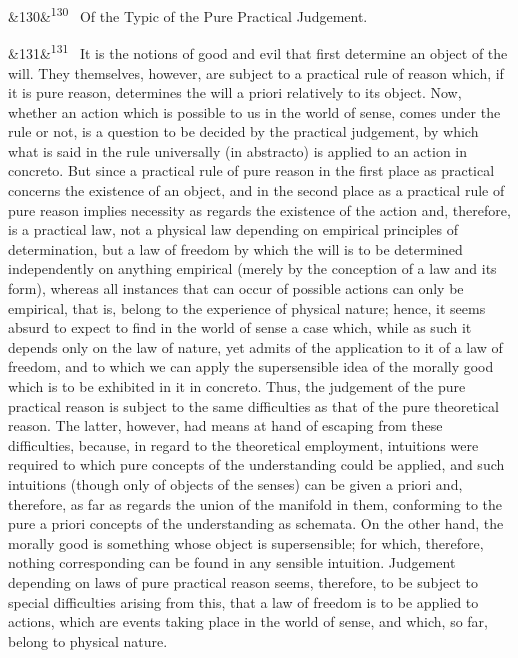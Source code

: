 \documentclass[12pt]{article}
\newcommand{\para}[1][]{\par\noindent\ifx&#1&\else\textsuperscript{\footnotesize #1}~\fi}
\begin{document}
\para[130] Of the Typic of the Pure Practical Judgement.

\para[131] It is the notions of good and evil that first determine an object of the will. They themselves, however, are subject to a practical rule of reason which, if it is pure reason, determines the will a priori relatively to its object. Now, whether an action which is possible to us in the world of sense, comes under the rule or not, is a question to be decided by the practical judgement, by which what is said in the rule universally (in abstracto) is applied to an action in concreto. But since a practical rule of pure reason in the first place as practical concerns the existence of an object, and in the second place as a practical rule of pure reason implies necessity as regards the existence of the action and, therefore, is a practical law, not a physical law depending on empirical principles of determination, but a law of freedom by which the will is to be determined independently on anything empirical (merely by the conception of a law and its form), whereas all instances that can occur of possible actions can only be empirical, that is, belong to the experience of physical nature; hence, it seems absurd to expect to find in the world of sense a case which, while as such it depends only on the law of nature, yet admits of the application to it of a law of freedom, and to which we can apply the supersensible idea of the morally good which is to be exhibited in it in concreto. Thus, the judgement of the pure practical reason is subject to the same difficulties as that of the pure theoretical reason. The latter, however, had means at hand of escaping from these difficulties, because, in regard to the theoretical employment, intuitions were required to which pure concepts of the understanding could be applied, and such intuitions (though only of objects of the senses) can be given a priori and, therefore, as far as regards the union of the manifold in them, conforming to the pure a priori concepts of the understanding as schemata. On the other hand, the morally good is something whose object is supersensible; for which, therefore, nothing corresponding can be found in any sensible intuition. Judgement depending on laws of pure practical reason seems, therefore, to be subject to special difficulties arising from this, that a law of freedom is to be applied to actions, which are events taking place in the world of sense, and which, so far, belong to physical nature.
\end{document}
